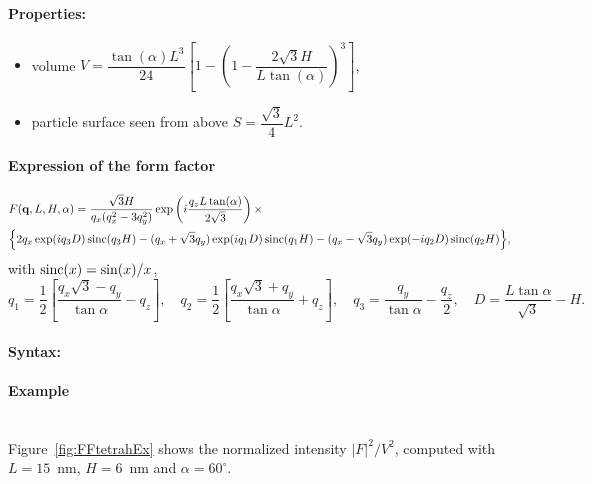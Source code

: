\paragraph{Properties:}
\begin{itemize}
\item volume $V= \dfrac{\tan(\alpha) L^3}{24} \left[1- \left(1 -
  \dfrac{2\sqrt{3} H}{L \tan(\alpha)} \right)^3\right]$,
\item particle surface seen from above $S =\dfrac{\sqrt{3}}{4}L^2$.
\end{itemize}

\paragraph{Expression of the form factor}

\begin{align*}
&F(\mathbf{q}, L, H, \alpha)=\frac{\sqrt{3}H}{q_x (q_x^2-3q_y^2)}
\exp\left(i\frac{q_z L\tan (\alpha)}{2\sqrt{3}}\right) \times \\
&\Big\{2q_x \exp(iq_3 D)\operatorname{sinc}(q_3 H) - (q_x +\sqrt{3}q_y)
\exp(iq_1 D)\operatorname{sinc}(q_1 H) -(q_x-\sqrt{3}q_y)\exp(-iq_2
D)\operatorname{sinc}(q_2 H) \Big\}, 
\end{align*}
with $\operatorname{sinc}(x)=\sin(x)/x$,
\begin{equation*}
q_1  =\frac{1}{2}\left[\frac{q_x\sqrt{3} -q_y}{\tan \alpha}-q_z \right],
\quad q_2 = \frac{1}{2}\left[\frac{q_x\sqrt{3} +q_y}{\tan \alpha}+q_z
\right], \quad 
q_3 = \frac{q_y}{\tan \alpha} -\frac{q_z}{2}, \quad D = \frac{L \tan \alpha}{\sqrt{3}} -H.
\end{equation*}

\paragraph{Syntax:} 

\paragraph{Example}\mbox{}\\
Figure~\ref{fig:FFtetrahEx} shows the normalized intensity
$|F|^2/V^2$, computed with $L=15$~nm, $H=6$~nm and $\alpha =60
^{\circ}$.

